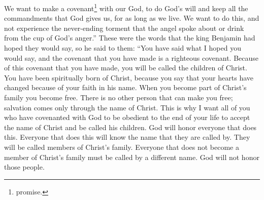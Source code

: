 We want to make a covenant\footnote{promise.} with our God, to do God's will and keep all the commandments that God gives us, for as long as we live. We want to do this, and not experience the never-ending torment that the angel spoke about or drink from the cup of God's anger.''
\bverse \iffalse And now, these are the words which king Benjamin desired of them; and therefore he said unto them: Ye have spoken the words that I desired; and the covenant which ye have made is a righteous covenant. \fi
These were the words that the king Benjamin had hoped they would say, so he said to them: ``You have said what I hoped you would say, and the covenant that you have made is a righteous covenant.
\bverse \iffalse And now, because of the covenant which ye have made ye shall be called the children of Christ, his sons, and his daughters; for behold, this day he hath spiritually begotten you; for ye say that your hearts are changed through faith on his name; therefore, ye are born of him and have become his sons and his daughters. \fi
Because of this covenant that you have made, you will be called the children of Christ. You have been spiritually born of Christ, because you say that your hearts have changed because of your faith in his name. 
\bverse \iffalse And under this head ye are made free, and there is no other head whereby ye can be made free. There is no other name given whereby salvation cometh; therefore, I would that ye should take upon you the name of Christ, all you that have entered into the covenant with God that ye should be obedient unto the end of your lives. \fi
When you become part of Christ's family you become free. There is no other person that can make you free; salvation comes only through the name of Christ. This is why I want all of you who have covenanted with God to be obedient to the end of your life to accept the name of Christ and be called his children.
\bverse \iffalse And it shall come to pass that whosoever doeth this shall be found at the right hand of God, for he shall know the name by which he is called; for he shall be called by the name of Christ. \fi
God will honor everyone that does this. Everyone that does this will know the name that they are called by. They will be called members of Christ's family.
\bverse \iffalse And now it shall come to pass, that whosoever shall not take upon him the name of Christ must be called by some other name; therefore, he findeth himself on the left hand of God. \fi
Everyone that does not become a member of Christ's family must be called by a different name. God will not honor those people.
